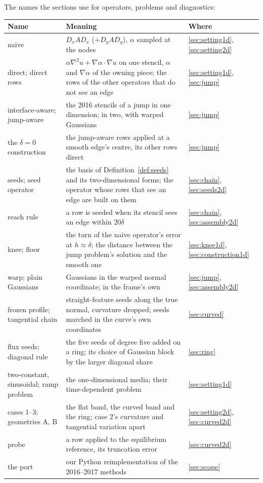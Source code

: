 \documentclass[11pt]{amsart}
\theoremstyle{definition}
\theoremstyle{remark}
\begin{document}
\noindent\begin{minipage}{\textwidth}
The names the sections use for operators, problems and diagnostics:
\begin{center}
\footnotesize
\begin{tabular}{@{}p{}p{}l@{}}
\toprule
Name & Meaning & Where \\
\midrule
naive & $D_x A D_x$ ($+ D_y A D_y$), $\alpha$ sampled at the nodes &
  \ref{sec:setting1d}, \ref{sec:setting2d} \\
direct; direct rows & $\alpha \nabla^2 u + \nabla \alpha \cdot \nabla u$ on
  one stencil, $\alpha$ and $\nabla \alpha$ of the owning piece; the rows
  of the other operators that do not see an edge & \ref{sec:setting1d},
  \ref{sec:jump} \\
interface-aware; jump-aware & the 2016 stencils of a jump in one
  dimension; in two, with warped Gaussians & \ref{sec:jump} \\
the $\delta = 0$ construction & the jump-aware rows applied at a smooth
  edge's centre, its other rows direct & \ref{sec:jump} \\
seeds; seed operator & the basis of Definition~\ref{def:seeds} and its
  two-dimensional forms; the operator whose rows that see an edge are built
  on them & \ref{sec:chain}, \ref{sec:seeds2d} \\
reach rule & a row is seeded when its stencil sees an edge within
  $20\delta$ & \ref{sec:chain}, \ref{sec:assembly2d} \\
knee; floor & the turn of the naive operator's error at $h \approx
  \delta$; the distance between the jump problem's solution and the smooth
  one & \ref{sec:knee1d}, \ref{sec:construction1d} \\
warp; plain Gaussians & Gaussians in the warped normal coordinate; in the
  frame's own & \ref{sec:jump}, \ref{sec:assembly2d} \\
frozen profile; tangential chain & straight-feature seeds along the true
  normal, curvature dropped; seeds marched in the curve's own coordinates
  & \ref{sec:curved} \\
flux seeds; diagonal rule & the five seeds of degree five added on a ring;
  its choice of Gaussian block by the larger diagonal share &
  \ref{sec:ring} \\
two-constant, sinusoidal; ramp problem & the one-dimensional media; their
  time-dependent problem & \ref{sec:setting1d} \\
cases 1--3; geometries A, B & the flat band, the curved band and the ring;
  case 2's curvature and tangential variation apart & \ref{sec:setting2d},
  \ref{sec:curved2d} \\
probe & a row applied to the equilibrium reference, its truncation error &
  \ref{sec:curved2d} \\
the port & our Python reimplementation of the 2016--2017 methods &
  \ref{sec:scope} \\
\bottomrule
\end{tabular}
\end{center}
\end{minipage}
\end{document}
